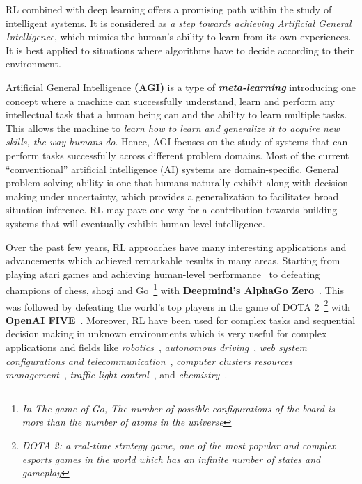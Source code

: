 

RL combined with deep learning offers a promising path within the study of intelligent systems. It is considered as \textit{a step towards achieving Artificial General Intelligence}, which mimics the human's ability to learn from its own experiences. It is best applied to situations where algorithms have to decide according to their environment.

Artificial General Intelligence \textbf{(AGI)} is a type of \textit{\textbf{meta-learning}} introducing one concept where a machine can successfully understand, learn and perform any intellectual task that a human being can and the ability to learn multiple tasks. This allows the machine to \textit{learn how to learn and generalize it to acquire new skills, the way humans do}. Hence, AGI focuses on the study of systems that can perform tasks successfully across different problem domains. Most of the current ``conventional'' artificial intelligence (AI) systems are domain-specific. General problem-solving ability is one that humans naturally exhibit along with decision making under uncertainty, which provides a generalization to facilitates broad situation inference. RL may pave one way for a contribution towards building systems that will eventually exhibit human-level intelligence.

Over the past few years, RL approaches have many interesting applications and advancements which achieved remarkable results in many areas. Starting from playing atari games and achieving human-level performance~\parencite{mnih2015human} to defeating champions of chess, shogi and Go~\footnote{\textit{In The game of Go, The number of possible configurations of the board is more than the number of atoms in the universe}} with \textbf{Deepmind's AlphaGo Zero}~\parencite{silver2017mastering}. This was followed by defeating the world's top players in the game of DOTA 2~\footnote{\textit{DOTA 2: a real-time strategy game, one of the most popular and complex esports games in the world which has an infinite number of states and gameplay}} with \textbf{OpenAI FIVE}~\parencite{OpenAI_dota}. Moreover, RL have been used for complex tasks and sequential decision making in unknown environments which is very useful for complex applications and fields like \textit{robotics}~\parencite{kober2013reinforcement, levine2016end, 45926, singh2019end}, \textit{autonomous driving}~\parencite{sallab2017deep, xu2018zero}, \textit{web system configurations and telecommunication}~\parencite{bu2009reinforcement}, \textit{computer clusters resources management}~\parencite{mao2016resource}, \textit{traffic light control}~\parencite{arel2010reinforcement}, and \textit{chemistry}~\parencite{zhou2017optimizing}.

